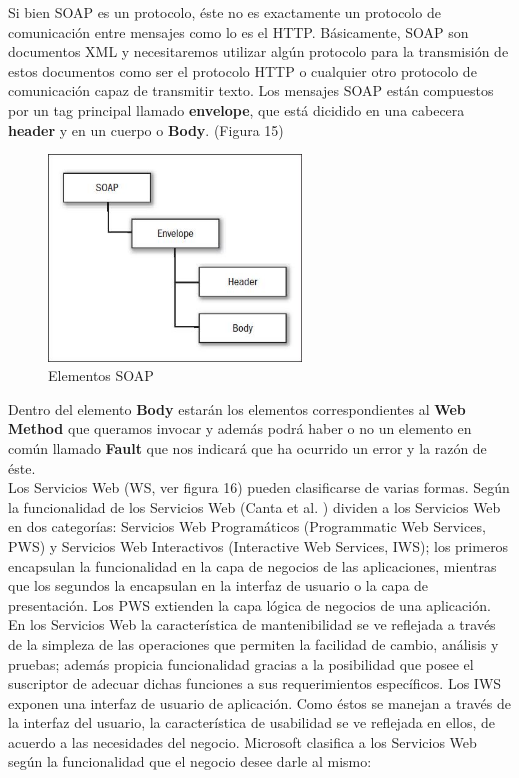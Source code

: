 \documentclass[12pt,letterpaper,titlepage]{article}
\begin{document}
Si bien SOAP es un protocolo, éste no es exactamente un protocolo de comunicación entre mensajes como lo es el HTTP. Básicamente, SOAP son documentos XML y necesitaremos utilizar algún protocolo para la transmisión de estos documentos como ser el protocolo HTTP o cualquier otro protocolo de comunicación capaz de transmitir texto. Los mensajes SOAP están compuestos por un tag principal llamado \textbf{envelope}, que está dicidido en una cabecera \textbf{header} y en un cuerpo o \textbf{Body}. (Figura 15)\\

\begin{figure}
  \centering
    \includegraphics[width=0.6\textwidth]{15_soapelements}
  \caption{Elementos SOAP}
  \label{fig15:elemsoap}
\end{figure}


Dentro del elemento \textbf{Body} estarán los elementos correspondientes al \textbf{Web Method} que queramos invocar y además podrá haber o no un elemento en común llamado \textbf{Fault} que nos indicará que ha ocurrido un error y la razón de éste.\\



Los Servicios Web (WS, ver figura 16) pueden clasificarse de varias formas. Según la funcionalidad de los Servicios Web (Canta et al. \cite{121}) dividen a los Servicios Web en dos categorías: Servicios Web Programáticos (Programmatic Web Services, PWS) y Servicios Web Interactivos (Interactive Web Services, IWS); los primeros encapsulan la funcionalidad en la capa de negocios de las aplicaciones, mientras que los segundos la encapsulan en la interfaz de usuario o la capa de presentación. Los PWS extienden la capa lógica de negocios de una aplicación. En los Servicios Web la característica de mantenibilidad se ve reflejada a través de la simpleza de las operaciones que permiten la facilidad de cambio, análisis y pruebas; además propicia funcionalidad gracias a la posibilidad que posee el suscriptor de adecuar dichas funciones a sus requerimientos específicos. Los IWS exponen una interfaz de usuario de aplicación. Como éstos se manejan a través de la interfaz del usuario, la característica de usabilidad se ve reflejada en ellos, de acuerdo a las necesidades del negocio. Microsoft \cite{122} clasifica a los Servicios Web según la funcionalidad que el negocio desee darle al mismo:\\
\end{document}
